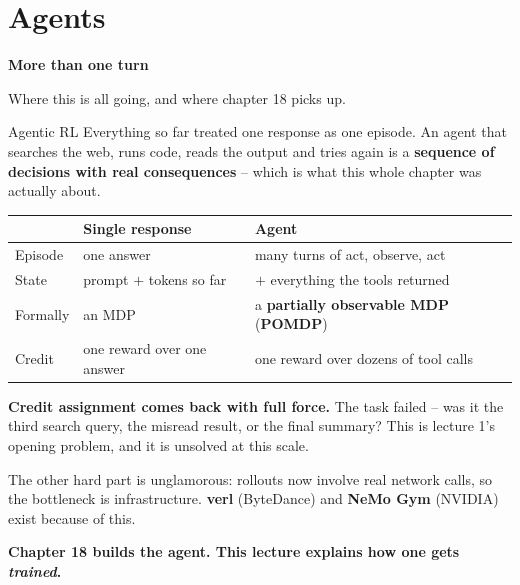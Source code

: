 \documentclass[aspectratio=169]{beamer}
\begin{document}
\section{Agents}
\begin{frame}[plain]
  \begin{center}
    \vskip 1.6cm
    {\Huge\bfseries\color{popblue}More than one turn}

    \vskip 0.6cm
    {\large Where this is all going, and where chapter 18 picks up.}
  \end{center}
\end{frame}

\begin{frame}{Agentic RL}
  \small
  Everything so far treated one response as one episode. An agent that searches the web, runs
  code, reads the output and tries again is a \textbf{sequence of decisions with real
  consequences} -- which is what this whole chapter was actually about.

  \vskip 8pt
  \begin{center}
  \footnotesize
  \begin{tabular}{l l l}
    \toprule
    & \textbf{Single response} & \textbf{Agent} \\
    \midrule
    Episode & one answer & many turns of act, observe, act \\
    State & prompt $+$ tokens so far & $+$ everything the tools returned \\
    Formally & an MDP & a \textbf{partially observable MDP} (\textbf{POMDP}) \\
    Credit & one reward over one answer & one reward over dozens of tool calls \\
    \bottomrule
  \end{tabular}
  \end{center}

  \vskip 8pt
  \begin{tcolorbox}[colback=armorange!12, colframe=armorange, boxrule=0.6pt, arc=2pt]
    \small
    \textbf{Credit assignment comes back with full force.} The task failed -- was it the third
    search query, the misread result, or the final summary? This is lecture 1's opening problem,
    and it is unsolved at this scale.

    \vskip 3pt
    The other hard part is unglamorous: rollouts now involve real network calls, so the
    bottleneck is infrastructure. \textbf{verl} (ByteDance) and \textbf{NeMo Gym} (NVIDIA) exist
    because of this.

    \vskip 3pt
    \textbf{Chapter 18 builds the agent. This lecture explains how one gets \emph{trained}.}
  \end{tcolorbox}
\end{frame}
\end{document}
